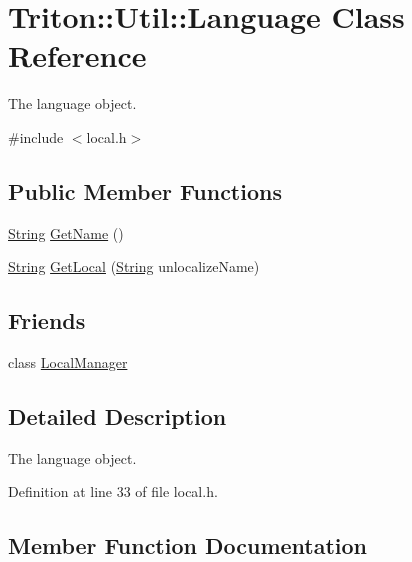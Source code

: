 \hypertarget{class_triton_1_1_util_1_1_language}{}\section{Triton\+:\+:Util\+:\+:Language Class Reference}
\label{class_triton_1_1_util_1_1_language}


The language object.  




{\ttfamily \#include $<$local.\+h$>$}

\subsection*{Public Member Functions}
\begin{DoxyCompactItemize}
\item 
\hyperlink{namespace_triton_1_1_util_ab36ffddebe19fdd103ec60af3841d9e2}{String} \hyperlink{class_triton_1_1_util_1_1_language_a16fd4d6c079f1a6d310dafe3c0587520}{Get\+Name} ()
\item 
\hyperlink{namespace_triton_1_1_util_ab36ffddebe19fdd103ec60af3841d9e2}{String} \hyperlink{class_triton_1_1_util_1_1_language_a9a2b45374aa49fa1dc9910afd92288c6}{Get\+Local} (\hyperlink{namespace_triton_1_1_util_ab36ffddebe19fdd103ec60af3841d9e2}{String} unlocalize\+Name)
\end{DoxyCompactItemize}
\subsection*{Friends}
\begin{DoxyCompactItemize}
\item 
class \hyperlink{class_triton_1_1_util_1_1_language_af7a1efe82e3beafa2fa9fc62c5ce5837}{Local\+Manager}
\end{DoxyCompactItemize}


\subsection{Detailed Description}
The language object. 

Definition at line 33 of file local.\+h.



\subsection{Member Function Documentation}
\hypertarget{class_triton_1_1_util_1_1_language_a9a2b45374aa49fa1dc9910afd92288c6}{}
